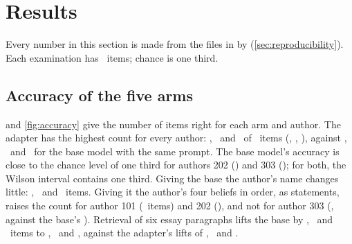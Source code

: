 
\section{Results}\label{sec:results}

Every number in this section is made from the files in  by
 (\cref{sec:reproducibility}). Each examination has \ExamItems\ items;
chance is one third.

\subsection{Accuracy of the five arms}\label{sec:accuracy}

 and \cref{fig:accuracy} give the number of items right for each arm and
author. The adapter has the highest count for every author: \RightATuned, \RightBTuned\ and
\RightCTuned\ of \ExamItems\ items (\AccATuned, \AccBTuned, \AccCTuned), against
\RightABase, \RightBBase\ and \RightCBase\ for the base model with the same prompt. The
base model's accuracy is close to the chance level of one third for authors 202 (\AccBBase) and
303 (\AccCBase); for both, the Wilson interval contains one third. Giving the base the author's name changes little: \RightANamed, \RightBNamed\
and \RightCNamed\ items. Giving it the author's four beliefs in order, as statements, raises the
count for author 101 (\RightAPrinciples\ items) and 202 (\RightBPrinciples), and not for author
303 (\RightCPrinciples, against the base's \RightCBase). Retrieval of six essay paragraphs lifts
the base by \LiftARetrieval, \LiftBRetrieval\ and \LiftCRetrieval\ items to \RightARetrieval, \RightBRetrieval\
and \RightCRetrieval, against the adapter's lifts of \LiftATuned, \LiftBTuned\ and \LiftCTuned.

\begin{table}[t]
\centering\small

\caption{Items right out of \ExamItems\ (accuracy) [95\% Wilson interval], by arm and author.
Chance is $1/3$.}
\label{tab:main}
\end{table}

